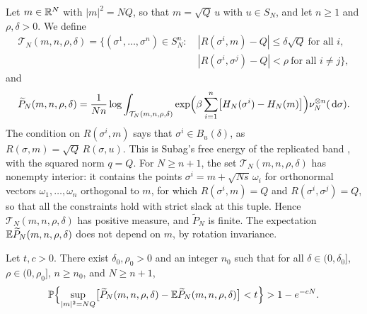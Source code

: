 Let $m\in\mathbb R^N$ with $|m|^2=NQ$, so that $m=\sqrt Q\,u$ with $u\in S_N$, and let $n\ge1$ and $\rho,\delta>0$. We define
\[
\begin{split}
\mathcal T_N(m,n,\rho,\delta)=\bigl\{(\sigma^1,\dots,\sigma^n)\in S_N^n:\ &|R(\sigma^i,m)-Q|\le\delta\sqrt Q\ \text{for all }i,\\
&|R(\sigma^i,\sigma^j)-Q|<\rho\ \text{for all }i\ne j\bigr\},
\end{split}
\]
and
\begin{equation}\label{eq:pc-replicated}
\widetilde P_N(m,n,\rho,\delta)=\frac1{Nn}\log\int_{\mathcal T_N(m,n,\rho,\delta)}\exp\Bigl(\beta\sum_{i=1}^n\bigl[H_N(\sigma^i)-H_N(m)\bigr]\Bigr)\nu_N^{\otimes n}(\,\mathrm d\sigma).
\end{equation}
The condition on $R(\sigma^i,m)$ says that $\sigma^i\in B_u(\delta)$, as $R(\sigma,m)=\sqrt Q\,R(\sigma,u)$. This is Subag's free energy of the replicated band \cite[(1.10)]{Subag2024}, with the squared norm $q=Q$. For $N\ge n+1$, the set $\mathcal T_N(m,n,\rho,\delta)$ has nonempty interior: it contains the points $\sigma^i=m+\sqrt{Ns}\,\omega_i$ for orthonormal vectors $\omega_1,\dots,\omega_n$ orthogonal to $m$, for which $R(\sigma^i,m)=Q$ and $R(\sigma^i,\sigma^j)=Q$, so that all the constraints hold with strict slack at this tuple. Hence $\mathcal T_N(m,n,\rho,\delta)$ has positive measure, and $\widetilde P_N$ is finite. The expectation $\mathbb E\widetilde P_N(m,n,\rho,\delta)$ does not depend on $m$, by rotation invariance.

\begin{proposition}\label{prop:pc-subag}
Let $t,c>0$. There exist $\delta_0,\rho_0>0$ and an integer $n_0$ such that for all $\delta\in(0,\delta_0]$, $\rho\in(0,\rho_0]$, $n\ge n_0$, and $N\ge n+1$,
\[
\mathbb P\Bigl\{\sup_{|m|^2=NQ}\bigl[\widetilde P_N(m,n,\rho,\delta)-\mathbb E\widetilde P_N(m,n,\rho,\delta)\bigr]<t\Bigr\}>1-e^{-cN}.
\]
\end{proposition}

